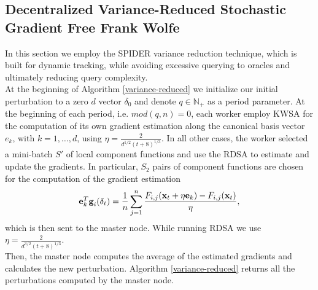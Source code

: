 \subsection{Decentralized Variance-Reduced Stochastic Gradient Free Frank Wolfe}
In this section we employ the SPIDER variance reduction technique, which is built for dynamic tracking, while avoiding excessive querying to oracles and ultimately reducing query complexity.\\
At the beginning of Algorithm \ref{variance-reduced} we initialize our initial perturbation to a zero $d$ vector \boldmath$\delta_0$ and denote $q \in \mathbb{N}_{+}$ as a period parameter. At the beginning of each period, i.e. $mod(q,n)=0$, each worker employ KWSA for the computation of its own gradient estimation along the canonical basis vector $e_k$, with $k=1, \dots, d$, using $\eta = \frac{2}{d^{1/2}(t+8)^{1/3}}$. In all other cases, the worker selected a mini-batch $ S'$ of local component functions and use the RDSA to estimate and update the gradients. In particular, $S_2$ pairs of component functions are chosen for the computation of the gradient estimation
\[\textbf{e}_k^T\textbf{g}_i(\text{\boldmath} \delta_t) = \frac{1}{n}\sum_{j=1}^{n}\frac{F_{i,j}(\textbf{x}_t + \eta\textbf{e}_k) - F_{i,j}(\textbf{x}_t) }{\eta},\]
which is then sent to the master node. While running RDSA we use $\eta = \frac{2}{d^{3/2}(t+8)^{1/3}}$.\\
Then, the master node computes the average of the estimated gradients and calculates the new perturbation. Algorithm \ref{variance-reduced} returns all the perturbations computed by the master node.
